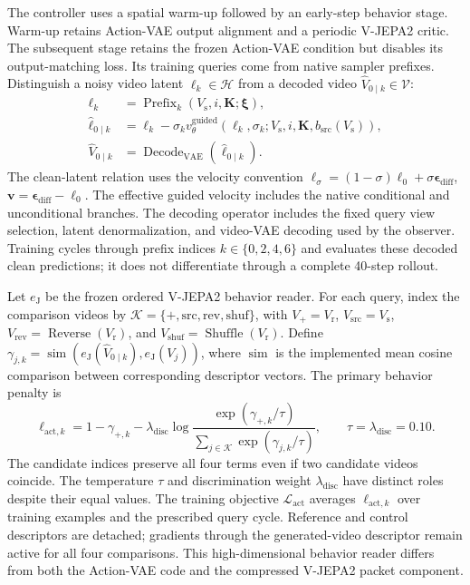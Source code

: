 The controller uses a spatial warm-up followed by an early-step behavior
stage. Warm-up retains Action-VAE output alignment and a periodic
V-JEPA2 critic. The subsequent stage retains the frozen Action-VAE
condition but disables its output-matching loss. Its training queries
come from native sampler prefixes. Distinguish a noisy video latent
$\boldsymbol\ell_k\in\mathcal H$ from a decoded video
$\widehat V_{0\mid k}\in\mathcal V$:
\begin{equation}
 \begin{aligned}
  \boldsymbol\ell_k&=\operatorname{Prefix}_k(V_{\mathrm s},i,\mathbf K;\boldsymbol\xi),\\
  \widehat{\boldsymbol\ell}_{0\mid k}
    &=\boldsymbol\ell_k-\sigma_k v_\theta^{\mathrm{guided}}
          (\boldsymbol\ell_k,\sigma_k;V_{\mathrm s},i,\mathbf K,b_{\mathrm{src}}(V_{\mathrm s})),\\
  \widehat V_{0\mid k}
    &=\operatorname{Decode}_{\mathrm{VAE}}(\widehat{\boldsymbol\ell}_{0\mid k}).
 \end{aligned}
 \label{eq:impl-controller-query}
\end{equation}
The clean-latent relation uses the velocity convention
$\boldsymbol\ell_\sigma=(1-\sigma)\boldsymbol\ell_0+\sigma\boldsymbol\epsilon_{\mathrm{diff}}$,
$\mathbf v=\boldsymbol\epsilon_{\mathrm{diff}}-\boldsymbol\ell_0$.
The effective guided velocity includes the native conditional and
unconditional branches. The decoding operator includes the fixed query
view selection, latent denormalization, and video-VAE decoding used by
the observer. Training cycles through prefix indices $k\in\{0,2,4,6\}$
and evaluates these decoded clean predictions; it does not differentiate
through a complete 40-step rollout.

Let $e_{\mathrm J}$ be the frozen ordered V-JEPA2 behavior reader.
For each query, index the comparison videos by $\mathcal K=\{+,\mathrm{src},\mathrm{rev},\mathrm{shuf}\}$,
with $V_+=V_{\mathrm r}$, $V_{\mathrm{src}}=V_{\mathrm s}$, $V_{\mathrm{rev}}=\operatorname{Reverse}(V_{\mathrm r})$,
and $V_{\mathrm{shuf}}=\operatorname{Shuffle}(V_{\mathrm r})$.
Define
$\gamma_{j,k}=\operatorname{sim}(e_{\mathrm J}(\widehat V_{0\mid k}),e_{\mathrm J}(V_j))$,
where $\operatorname{sim}$ is the implemented mean cosine comparison
between corresponding descriptor vectors.
The primary behavior penalty is
\begin{equation}
 \ell_{\mathrm{act},k}
 =1-\gamma_{+,k}-\lambda_{\mathrm{disc}}\log
   \frac{\exp(\gamma_{+,k}/\tau)}
        {\sum_{j\in\mathcal K}\exp(\gamma_{j,k}/\tau)},
 \qquad \tau=\lambda_{\mathrm{disc}}=0.10.
 \label{eq:impl-behavior-loss}
\end{equation}
The candidate indices preserve all four terms even if two candidate
videos coincide. The temperature $\tau$ and discrimination weight
$\lambda_{\mathrm{disc}}$ have distinct roles despite their equal values.
The training objective $\mathcal L_{\mathrm{act}}$ averages
$\ell_{\mathrm{act},k}$ over training examples and the prescribed query cycle.
Reference and control descriptors are detached; gradients through the
generated-video descriptor remain active for all four comparisons.
This high-dimensional behavior reader differs from both the
Action-VAE code and the compressed V-JEPA2 packet component.

